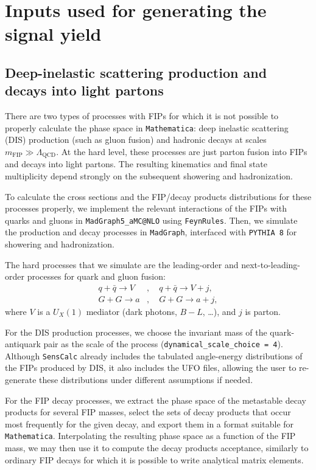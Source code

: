 \documentclass[
    aps,prd,
    twocolumn,
    nofootinbib,
    superscriptaddress,
]{revtex4}
\begin{document}
\section{Inputs used for generating the signal yield}
\label{app:references}

\subsection{Deep-inelastic scattering production and decays into light partons}
\label{app:dis-simulation}

There are two types of processes with FIPs for which it is not possible to properly calculate the phase space in \texttt{Mathematica}: deep inelastic scattering (DIS) production (such as gluon fusion) and hadronic decays at scales $m_{\text{FIP}}\gg \Lambda_{\text{QCD}}$. At the hard level, these processes are just parton fusion into FIPs and decays into light partons. The resulting kinematics and final state multiplicity depend strongly on the subsequent showering and hadronization.

To calculate the cross sections and the FIP/decay products distributions for these processes properly, we implement the relevant interactions of the FIPs with quarks and gluons in \texttt{MadGraph5\_aMC@NLO} using \texttt{FeynRules}. Then, we simulate the production and decay processes in \texttt{MadGraph}, interfaced with \texttt{PYTHIA~8} for showering and hadronization. 

The hard processes that we simulate are the leading-order and next-to-leading-order processes for quark and gluon fusion:
\begin{equation}
\begin{aligned}
    q+\bar{q}\to V&, \quad  q+\bar{q}\to V + j,\\ G + G \to a&, \quad G + G \to a + j,
\end{aligned}
\end{equation}
where $V$ is a $U_{X}(1)$ mediator (dark photons, $B-L$, \dots), and $j$ is parton.


For the DIS production processes, we choose the invariant mass of the quark-antiquark pair as the scale of the process (\texttt{dynamical\_scale\_choice = 4}). Although \texttt{SensCalc} already includes the tabulated angle-energy distributions of the FIPs produced by DIS, it also includes the UFO files, allowing the user to re-generate these distributions under different assumptions if needed.

For the FIP decay processes, we extract the phase space of the metastable decay products for several FIP masses, select the sets of decay products that occur most frequently for the given decay, and export them in a format suitable for \texttt{Mathematica}. Interpolating the resulting phase space as a function of the FIP mass, we may then use it to compute the decay products acceptance, similarly to ordinary FIP decays for which it is possible to write analytical matrix elements.
\end{document}
